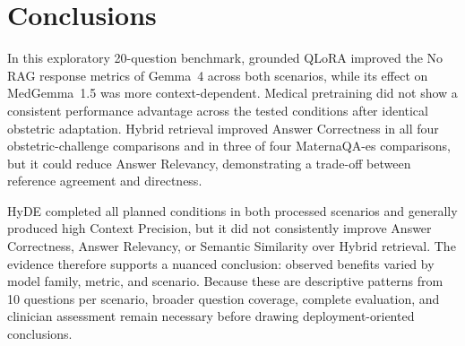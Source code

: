 \section{Conclusions}
In this exploratory 20-question benchmark, grounded QLoRA improved the
No RAG response metrics of Gemma~4 across both scenarios, while its
effect on MedGemma~1.5 was more context-dependent. Medical pretraining did
not show a consistent performance advantage across the tested conditions
after identical obstetric adaptation. Hybrid retrieval improved Answer
Correctness in all four obstetric-challenge comparisons and in three of
four MaternaQA-es comparisons, but it could reduce Answer Relevancy,
demonstrating a trade-off between reference agreement and directness.

HyDE completed all planned conditions in both processed scenarios and
generally produced high Context Precision, but it did not consistently
improve Answer Correctness, Answer Relevancy, or Semantic Similarity over
Hybrid retrieval. The evidence therefore supports a nuanced conclusion:
observed benefits varied by model family, metric, and scenario. Because
these are descriptive patterns from 10 questions per scenario, broader
question coverage, complete evaluation, and clinician assessment remain
necessary before drawing deployment-oriented conclusions.





